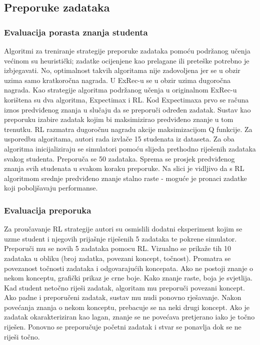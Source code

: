 \documentclass[times, utf8,projekt]{fer}
\begin{document}
\subsection{Preporuke zadataka}
\subsubsection{Evaluacija porasta znanja studenta}
Algoritmi za treniranje strategije preporuke zadataka pomoću podržanog učenja većinom su heuristički; zadatke ocijenjene kao prelagane ili preteške potrebno je izbjegavati. No, optimalnost takvih algoritama nije zadovoljena jer se u obzir uzima samo kratkoročna nagrada. U ExRec-u se u obzir uzima dugoročna nagrada. \newline
Kao strategije algoritma podržanog učenja u originalnom ExRec-u korištena su dva algoritma, Expectimax i RL. Kod Expectimaxa prvo se računa iznos predviđenog znanja u slučaju da se preporuči određen zadatak. Sustav kao preporuku izabire zadatak kojim bi maksimizirao predviđeno znanje u tom trenutku. RL razmatra dugoročnu nagradu akcije maksimizacijom Q funkcije.\newline
Za usporedbu algoritama, autori rada izvlače 15 studenata iz dataseta. Za oba algoritma inicijaliziraju se simulatori pomoću slijeda prethodno riješenih zadataka svakog studenta. Preporuča se 50 zadataka. Sprema se prosjek predviđenog znanja svih studenata u svakom koraku preporuke. %
Na slici je vidljivo da s RL algoritmom srednje predviđeno znanje stalno raste - moguće je pronaci zadatke koji poboljšavaju performanse.

\subsubsection{Evaluacija preporuka} %
Za proučavanje RL strategije autori su osmislili dodatni eksperiment kojim se uzme student i njegovih prijašnje riješenih 5 zadataka te pokrene simulator. Preporuči mu se novih 5 zadataka pomocu RL. Vizualno se prikaže tih 10 zadataka u obliku (broj zadatka, povezani koncept, točnost). Promatra se povezanost točnosti zadataka i odgovarajućih koncepata. Ako ne postoji znanje o nekom konceptu, grafički prikaz je crne boje. Kako znanje raste, boja je svjetlija.\newline
Kad student netočno riješi zadatak, algoritam mu preporuči povezani koncept. Ako padne i preporučeni zadatak, sustav mu nudi ponovno rješavanje.\newline
Nakon povećanja znanja o nekom konceptu, prebacuje se na neki drugi koncept. Ako je zadatak okarakteriziran kao lagan, znanje se ne povećava pretjerano iako je točno riješen.\newline
Ponovno se preporučuje početni zadatak i stvar se ponavlja dok se ne riješi točno.
\end{document}

